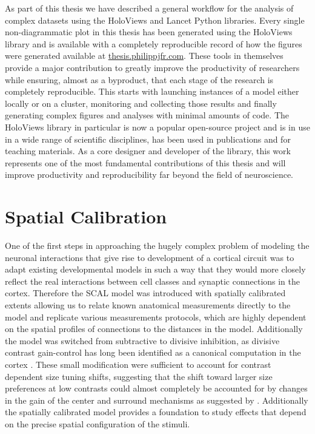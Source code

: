 As part of this thesis we have described a general workflow for the
analysis of complex datasets using the HoloViews and Lancet Python
libraries. Every single non-diagrammatic plot in this thesis has been
generated using the HoloViews library and is available with a
completely reproducible record of how the figures were generated
available at \url{thesis.philippjfr.com}. These tools in themselves
provide a major contribution to greatly improve the productivity of
researchers while ensuring, almost as a byproduct, that each stage of
the research is completely reproducible. This starts with launching
instances of a model either locally or on a cluster, monitoring and
collecting those results and finally generating complex figures and
analyses with minimal amounts of code. The HoloViews library in
particular is now a popular open-source project and is in use in a
wide range of scientific disciplines, has been used in publications
and for teaching materials. As a core designer and developer of the
library, this work represents one of the most fundamental
contributions of this thesis and will improve productivity and
reproducibility far beyond the field of neuroscience.

\section{Spatial Calibration}

One of the first steps in approaching the hugely complex problem of
modeling the neuronal interactions that give rise to development of a
cortical circuit was to adapt existing developmental models in such a
way that they would more closely reflect the real interactions between
cell classes and synaptic connections in the cortex. Therefore the
SCAL model was introduced with spatially calibrated extents allowing
us to relate known anatomical measurements directly to the model and
replicate various measurements protocols, which are highly dependent
on the spatial profiles of connections to the distances in the
model. Additionally the model was switched from subtractive to
divisive inhibition, as divisive contrast gain-control has long been
identified as a canonical computation in the cortex
\citep{Carandini2012}. These small modification were sufficient to
account for contrast dependent size tuning shifts, suggesting that the
shift toward larger size preferences at low contrasts could almost
completely be accounted for by changes in the gain of the center and
surround mechanisms as suggested by \cite{Cavanaugh2002}. Additionally
the spatially calibrated model provides a foundation to study effects
that depend on the precise spatial configuration of the stimuli.

